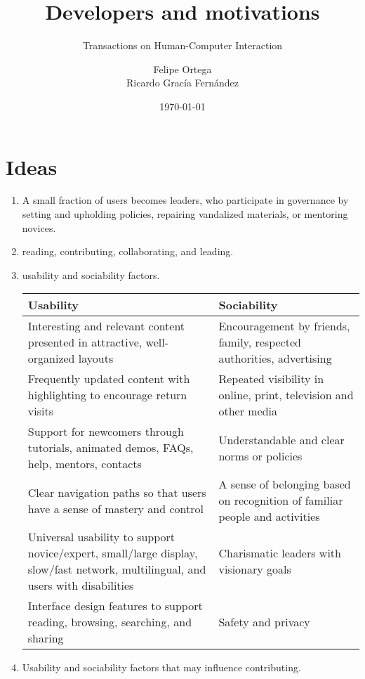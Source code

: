 \documentclass[11pt]{scrartcl}
\title{\textbf{Developers and motivations}}
\subtitle{Transactions on Human-Computer Interaction}
\author{Felipe Ortega\\
		Ricardo Grac\'ia Fern\'andez}
\date{\today}
\begin{document}
\maketitle

\section{Ideas}

	\begin{enumerate}
	
		\item A small fraction of users becomes leaders, who participate in governance by setting and upholding policies, repairing vandalized materials, or mentoring novices.
		\item reading, contributing, collaborating, and leading.
		\item usability and sociability factors.\\

		\begin{tabular}{ | p{6,5cm} | p{} |}
			\hline
			Usability & Sociability \\ \hline
			Interesting and relevant content presented in attractive, well-organized layouts & Encouragement by friends, family, respected authorities, advertising \\ \hline
			Frequently updated content with highlighting to encourage return visits & Repeated visibility in online, print, television and other media \\ \hline
			Support for newcomers through tutorials, animated demos, FAQs, help, mentors, contacts & Understandable and clear norms or policies \\ \hline
			Clear navigation paths so that users have a sense of mastery and control & A sense of belonging based on recognition of familiar people and activities \\ \hline
			Universal usability to support novice/expert, small/large display, slow/fast network, multilingual, and users with disabilities & Charismatic leaders with visionary goals \\ \hline
			Interface design features to support reading, browsing, searching, and sharing & Safety and privacy \\ \hline
		\end{tabular}
					
		\item Usability and sociability factors that may influence contributing.\\


\end{enumerate}
\end{document}
